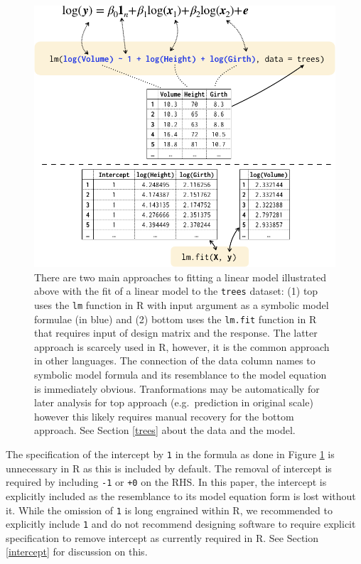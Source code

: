 \documentclass[runningheads]{llncs}
\begin{document}
\begin{figure}
\includegraphics[width=0.9\linewidth,fbox]{images/symbolic_lm} \caption{There are two main approaches to fitting a linear model illustrated above with the fit of a linear model to the \texttt{trees} dataset: (1) top uses the \texttt{lm} function in R with input argument as a symbolic model formulae (in blue) and (2) bottom uses the \texttt{lm.fit} function in R that requires input of design matrix and the response. The latter approach is scarcely used in R, however, it is the common approach in other languages. The connection of the data column names to symbolic model formula and its resemblance to the model equation is immediately obvious. Tranformations may be automatically for later analysis for top approach (e.g.~prediction in original scale) however this likely requires manual recovery for the bottom approach. See Section \ref{trees} about the data and the model.}\label{fig:symbolic-lm}
\end{figure}



The specification of the intercept by \texttt{1} in the formula as done in Figure \ref{fig:symbolic-lm} is unnecessary in R as this is included by default. The removal of intercept is required by including \texttt{-1} or \texttt{+0} on the RHS. In this paper, the intercept is explicitly included as the resemblance to its model equation form is lost without it. While the omission of \texttt{1} is long engrained within R, we recommended to explicitly include \texttt{1} and do not recommend designing software to require explicit specification to remove intercept as currently required in R. See Section \ref{intercept} for discussion on this.
\end{document}
